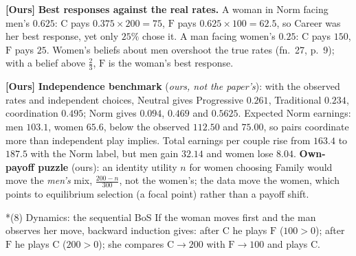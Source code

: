 \documentclass[10pt,a4paper]{article}
\makeatletter
\renewcommand\section{\@startsection{section}{1}{\z@}{6pt plus 2pt}{2pt}{\normalfont\large\bfseries}}
\newcommand{\ours}{\textcolor{warn}{\textbf{[Ours]}}}
\newcommand{\C}{\mathrm{C}}
\newcommand{\Fm}{\mathrm{F}}
\makeatother
\begin{document}
\ours{} \textbf{Best responses against the real rates.} A woman in Norm facing men's $0.625$: $\C$ pays
$0.375\times200=75$, $\Fm$ pays $0.625\times100=62.5$, so Career was her best response, yet only $25\%$
chose it. A man facing women's $0.25$: $\C$ pays $150$, $\Fm$ pays $25$. Women's beliefs about men
overshoot the true rates (fn.~27, p.~9); with a belief above $\tfrac23$, $\Fm$ is the woman's best response.

\ours{} \textbf{Independence benchmark} (\emph{ours, not the paper's}): with the observed rates and independent
choices, Neutral gives Progressive $0.261$, Traditional $0.234$, coordination $0.495$; Norm gives
$0.094$, $0.469$ and $0.5625$. Expected Norm earnings: men $103.1$, women $65.6$, below the observed
$112.50$ and $75.00$, so pairs coordinate more than independent play implies. Total earnings per
couple rise from $163.4$ to $187.5$ with the Norm label, but men gain $32.14$ and women lose $8.04$.
\textbf{Own-payoff puzzle} (ours): an identity utility $n$ for women choosing Family would move
the \emph{men's} mix, $\tfrac{200-n}{300}$, not the women's; the data move the women, which points to
equilibrium selection (a focal point) rather than a payoff shift.

\section*{(8) Dynamics: the sequential BoS}
If the woman moves first and the man observes her move, backward induction gives: after $\C$ he plays
$\Fm$ ($100>0$); after $\Fm$ he plays $\C$ ($200>0$); she compares $\C\to200$ with $\Fm\to100$ and plays $\C$.
\end{document}
